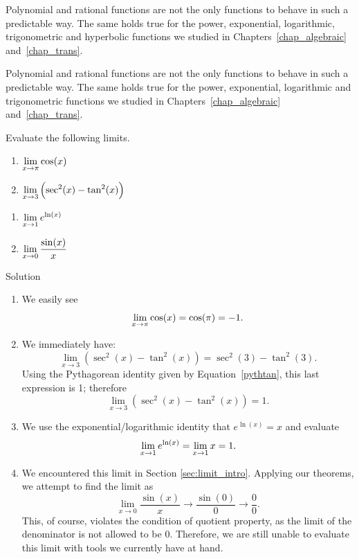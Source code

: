 \ifanalysis
Polynomial and rational functions are not the only functions to behave in such a predictable way. The same holds true for the power, exponential, logarithmic, trigonometric and hyperbolic functions we studied in Chapters~\ref{chap_algebraic} and~\ref{chap_trans}.
\fi

\ifvc
Polynomial and rational functions are not the only functions to behave in such a predictable way. The same holds true for the power, exponential, logarithmic and  trigonometric functions we studied in Chapters~\ref{chap_algebraic} and~\ref{chap_trans}.
\fi

\ifcalculus
\begin{example}\label{ex_limit_1}
Evaluate the following limits. 

\noindent\begin{minipage}[t]{.5\textwidth}
\begin{enumerate}
\item		$\displaystyle \lim_{x\to \pi} \cos (x)$
\item		$\displaystyle \lim_{x\to 3} \left(\sec^2(x) - \tan^2 (x)\right)$
\end{enumerate}
\end{minipage}
\begin{minipage}[t]{.5\textwidth}
\begin{enumerate}\addtocounter{enumi}{2}
\item		$\displaystyle \lim_{x\to 1} e^{\ln (x)}$
\item		$\displaystyle \lim_{x\to 0} \frac{\sin (x)}{x}$
\end{enumerate}
\end{minipage}

Solution 


\begin{enumerate}
\item		We easily see
 $$\displaystyle \lim_{x\to \pi} \cos(x) = \cos(\pi) = -1.$$
\item		We immediately have:
				$$\lim_{x\to 3} \left(\sec^2(x) - \tan^2 (x)\right) = \sec^2(3)-\tan^2(3).$$ Using the Pythagorean identity given by Equation~\eqref{pythtan}, this last expression is 1; therefore $$\lim_{x\to 3} \left(\sec^2 (x) - \tan^2 (x)\right) = 1.$$
	

\item		We use the exponential/logarithmic identity that $e^{\ln (x)} = x$ and evaluate 
$$\displaystyle \lim_{x\to 1} e^{\ln (x)} = \lim_{x\to 1} x = 1.$$ 

\item		We encountered this limit in Section \ref{sec:limit_intro}. Applying our theorems, we attempt to find the limit as $$\lim_{x\to 0}\frac{\sin(x)}{x}\rightarrow \frac{\sin(0)}{0} \rightarrow \frac{0}{0}.$$ This, of course, violates the condition of quotient property, as the limit of the denominator is not allowed to be 0. Therefore, we are still unable to evaluate this limit with tools we currently have at hand.
\end{enumerate}
\end{example}
\fi

